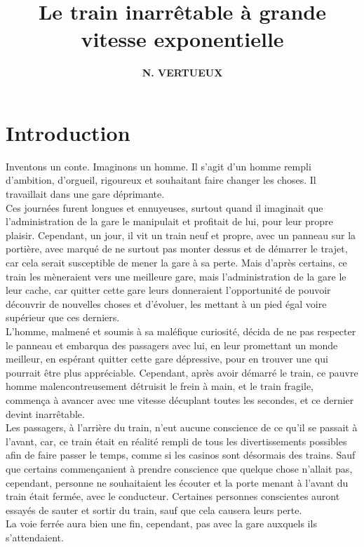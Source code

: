 \documentclass[twocolumn, french]{article}
\author{\large{\textbf{N. VERTUEUX}}}
\title{
  \fontsize{30pt}{36pt}\selectfont \textbf{Le train inarrêtable à grande vitesse exponentielle}
}
\begin{document}
\maketitle
\section*{Introduction} 
Inventons un conte. Imaginons un homme. Il s'agit d'un homme rempli d'ambition, d'orgueil, rigoureux et 
souhaitant faire changer les choses. Il travaillait dans une gare déprimante. 
\\ 
Ces journées furent longues et ennuyeuses, surtout quand il imaginait que l'administration de la gare le 
manipulait et profitait de lui, pour leur propre plaisir. Cependant, un jour, il vit un train neuf et propre, 
avec un panneau sur la portière, avec marqué de ne surtout pas monter dessus et de démarrer le trajet, car cela 
serait susceptible de mener la gare à sa perte. Mais d'après certains, ce train les mèneraient vers une 
meilleure gare, mais l'administration de la gare le leur cache, car quitter cette gare leurs donneraient 
l'opportunité de pouvoir découvrir de nouvelles choses et d'évoluer, les mettant à un pied égal voire supérieur 
que ces derniers.   
\\
L'homme, malmené et soumis à sa maléfique curiosité, décida de ne pas respecter le panneau 
et embarqua des passagers avec lui, en leur promettant un monde meilleur, en espérant quitter 
cette gare dépressive, pour en trouver une qui pourrait être plus appréciable. Cependant, après 
avoir démarré le train, ce pauvre homme malencontreusement détruisit le frein à main, et le train fragile, 
commença à avancer avec une vitesse décuplant toutes les secondes, et ce dernier devint inarrêtable. 
\\
Les passagers, à l'arrière du train, n'eut aucune conscience de ce qu'il se passait à l'avant, car,
ce train était en réalité rempli de tous les divertissements possibles afin de faire passer le temps, 
comme si les casinos sont désormais des trains.
Sauf que certains commençanient à prendre conscience que quelque chose n'allait pas, cependant, personne ne 
souhaitaient les écouter et la porte menant à l'avant du train était fermée, avec le conducteur.
Certaines personnes conscientes auront essayés de sauter et sortir du train, sauf que cela causera leurs perte.
\\
La voie ferrée aura bien une fin, cependant, pas avec la gare auxquels ils s'attendaient.
\\ \\
\end{document}
